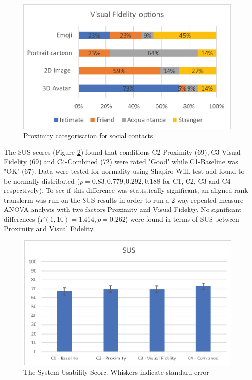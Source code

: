 \begin{figure}[ht]
    \centering
    \includegraphics[width=0.8\linewidth]{images/41-visualising-mgia17/analysis-images-01.eps}
    \caption{Proximity categorisation for social contacts}
    \label{fig:contacts:proximity}
\end{figure}

The SUS scores (Figure \ref{fig:contacts:sus}) found that conditions C2-Proximity (69), C3-Visual Fidelity (69) and C4-Combined (72) were rated "Good" while C1-Baseline was "OK" (67). Data were tested for normality using Shapiro-Wilk test and found to be normally distributed ($p=0.83, 0.779, 0.292, 0.188$ for C1, C2, C3 and C4 respectively). To see if this difference was statistically significant, an aligned rank transform was run on the SUS results in order to run a 2-way repeated measure ANOVA analysis with two factors Proximity and Visual Fidelity. No significant differences ($F(1, 10)=1.414,p=0.262$) were found in terms of SUS between Proximity and Visual Fidelity. 

\begin{figure}[ht]
    \centering
    \includegraphics[width=0.8\linewidth]{images/41-visualising-mgia17/analysis-images-02.eps}
    \caption{The System Usability Score. Whiskers indicate standard error.}
    \label{fig:contacts:sus}
\end{figure}

